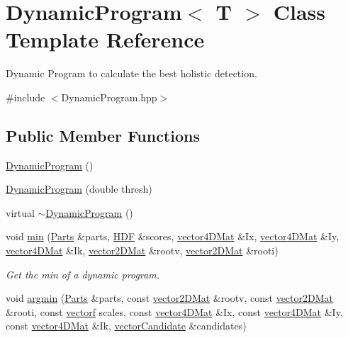 \hypertarget{classDynamicProgram}{\section{Dynamic\-Program$<$ T $>$ Class Template Reference}
\label{classDynamicProgram}
}


Dynamic Program to calculate the best holistic detection.  




{\ttfamily \#include $<$Dynamic\-Program.\-hpp$>$}

\subsection*{Public Member Functions}
\begin{DoxyCompactItemize}
\item 
\hyperlink{classDynamicProgram_ac9388ce41aec4bbb8003546859b17285}{Dynamic\-Program} ()
\item 
\hyperlink{classDynamicProgram_adb1e019e058d9b7f7b6cb419fb1e22cd}{Dynamic\-Program} (double thresh)
\item 
virtual \hyperlink{classDynamicProgram_a68458d8f58efec81d37712bd5ec99b51}{$\sim$\-Dynamic\-Program} ()
\item 
void \hyperlink{classDynamicProgram_a2758cc30f0fc8f32ac94c5b2e40cb433}{min} (\hyperlink{classParts}{Parts} \&parts, \hyperlink{classHDF}{H\-D\-F} \&scores, \hyperlink{types_8hpp_a9c446ceac5aee9d97fb9ee36ad27072f}{vector4\-D\-Mat} \&Ix, \hyperlink{types_8hpp_a9c446ceac5aee9d97fb9ee36ad27072f}{vector4\-D\-Mat} \&Iy, \hyperlink{types_8hpp_a9c446ceac5aee9d97fb9ee36ad27072f}{vector4\-D\-Mat} \&Ik, \hyperlink{types_8hpp_a33cacb85be7b8df3dc0b67d5d849f4cc}{vector2\-D\-Mat} \&rootv, \hyperlink{types_8hpp_a33cacb85be7b8df3dc0b67d5d849f4cc}{vector2\-D\-Mat} \&rooti)
\begin{DoxyCompactList}\small\item\em Get the min of a dynamic program. \end{DoxyCompactList}\item 
void \hyperlink{classDynamicProgram_a7f3276a0014489972129ad7c4a8d4a69}{argmin} (\hyperlink{classParts}{Parts} \&parts, const \hyperlink{types_8hpp_a33cacb85be7b8df3dc0b67d5d849f4cc}{vector2\-D\-Mat} \&rootv, const \hyperlink{types_8hpp_a33cacb85be7b8df3dc0b67d5d849f4cc}{vector2\-D\-Mat} \&rooti, const \hyperlink{types_8hpp_a4da5db3ee9e284f719ef5764dbadffc8}{vectorf} scales, const \hyperlink{types_8hpp_a9c446ceac5aee9d97fb9ee36ad27072f}{vector4\-D\-Mat} \&Ix, const \hyperlink{types_8hpp_a9c446ceac5aee9d97fb9ee36ad27072f}{vector4\-D\-Mat} \&Iy, const \hyperlink{types_8hpp_a9c446ceac5aee9d97fb9ee36ad27072f}{vector4\-D\-Mat} \&Ik, \hyperlink{types_8hpp_a04eefdf70d6c6b8effb5170271f1db05}{vector\-Candidate} \&candidates)

\end{DoxyCompactItemize}
